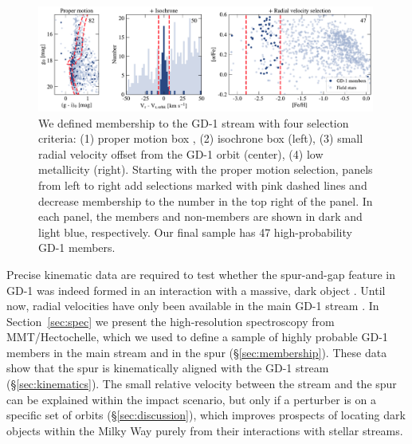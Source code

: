 \documentclass[twocolumn]{aastex63}
\begin{document}
\begin{figure}
\begin{center}
\includegraphics[width=0.99\textwidth]{members.pdf}
\end{center}
\caption{We defined membership to the GD-1 stream with four selection criteria: (1) proper motion box \citep[from][not shown]{pwb}, (2) isochrone box (left), (3) small radial velocity offset from the GD-1 orbit (center), (4) low metallicity (right).
Starting with the proper motion selection, panels from left to right add selections marked with pink dashed lines and decrease membership to the number in the top right of the panel.
In each panel, the members and non-members are shown in dark and light blue, respectively.
Our final sample has 47 high-probability GD-1 members.
}
\label{fig:members}
\end{figure}

Precise kinematic data are required to test whether the spur-and-gap feature in GD-1 was indeed formed in an interaction with a massive, dark object \citep{bonaca2019a}.
Until now, radial velocities have only been available in the main GD-1 stream \citep[][]{koposov2010,huang2019}.
In Section~\ref{sec:spec} we present the high-resolution spectroscopy from MMT/Hectochelle, which we used to define a sample of highly probable GD-1 members in the main stream and in the spur (\S\ref{sec:membership}).
These data show that the spur is kinematically aligned with the GD-1 stream (\S\ref{sec:kinematics}).
The small relative velocity between the stream and the spur can be explained within the impact scenario, but only if a perturber is on a specific set of orbits (\S\ref{sec:discussion}), which improves prospects of locating dark objects within the Milky Way purely from their interactions with stellar streams.
\end{document}
